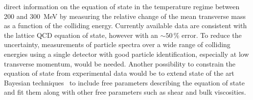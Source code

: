   direct information on the equation of state in the temperature regime 
  between 200 and 300~MeV by measuring the relative change of the mean 
  transverse mass as a function of the colliding energy. 
Currently available data are consistent with the lattice QCD equation of state, 
  however with an $\sim 50\,\%$ error. 
To reduce the uncertainty, measurements of particle spectra over a wide 
  range of colliding energies using a single detector with good particle 
  identification, especially at low transverse momentum, would be needed.
Another possibility to constrain the equation of state from experimental data 
  would be to extend state of the art Bayesian techniques~\cite{Moreland:2018gsh} 
  to include free parameters describing the equation of state and fit them 
  along with other free parameters such as shear and bulk viscosities. 


